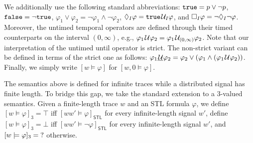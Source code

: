 We additionally use the following standard abbreviations: 
$\texttt{true} = p \lor \lnot p$,
$\texttt{false} = \lnot \texttt{true}$,
$ \varphi_1 \lor \varphi_2 = \lnot \varphi_1 \land \lnot \varphi_2$,
$\lozenge_I \varphi = \texttt{true} \kern.1em\mathcal{U}_I \varphi$, and
$\square_I \varphi = \lnot \lozenge_I \lnot \varphi$.
Moreover, the untimed temporal operators are defined through their timed counterparts on the interval $(0,\infty)$, e.g., $\varphi_1 \kern.1em\mathcal{U} \varphi_2 = \varphi_1 \kern.1em\mathcal{U}_{(0,\infty)} \varphi_2$.
Note that our interpretation of the untimed until operator is strict.
The non-strict variant can be defined in terms of the strict one as follows: $\varphi_1 \underline{\kern.1em\mathcal{U}} \varphi_2 = \varphi_2 \lor (\varphi_1 \land (\varphi_1 \kern.1em\mathcal{U} \varphi_2))$.
Finally, we simply write $[w \models \varphi]$ for $[w,0 \models \varphi]$.

The semantics above is defined for infinite traces while a distributed signal has finite length.
To bridge this gap, we take the standard extension to a 3-valued semantics.
Given a finite-length trace $w$ and an STL formula $\varphi$, 
we define $[w \models \varphi]_3 = \top$ iff $[w w' \models \varphi]_{\mathsf{STL}}$ for every infinite-length signal $w'$, define $[w \models \varphi]_3 = \bot$ iff $[w w' \models \lnot \varphi]_{\mathsf{STL}}$ for every infinite-length signal $w'$, and $[w \models \varphi]_3 = \text{?}$ otherwise.